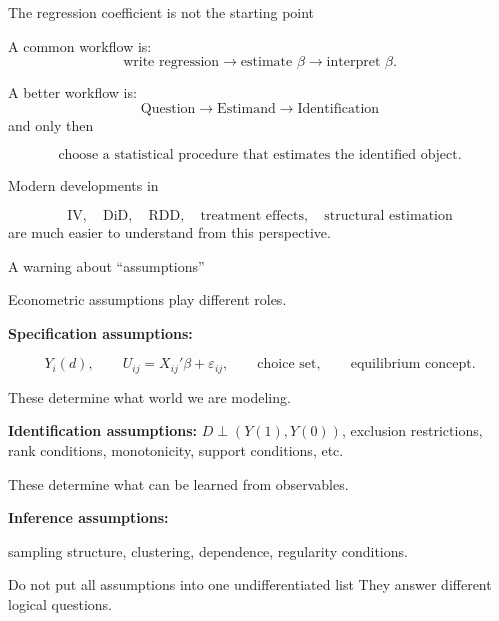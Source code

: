 \documentclass[aspectratio=169,11pt]{beamer}
\begin{document}
\begin{frame}{The regression coefficient is not the starting point}

A common workflow is:
\[
\text{write regression}
\rightarrow
\text{estimate }\beta
\rightarrow
\text{interpret }\beta.
\]

A better workflow is:
\[
\boxed{
\text{Question}
\rightarrow
\text{Estimand}
\rightarrow
\text{Identification}
}
\]
and only then

\[
\boxed{
\text{choose a statistical procedure that estimates the identified object}.
}
\]

\vspace{0.4em}

Modern developments in

\[
\text{IV},
\quad
\text{DiD},
\quad
\text{RDD},
\quad
\text{treatment effects},
\quad
\text{structural estimation}
\]
are much easier to understand from this perspective.

\end{frame}

\begin{frame}{A warning about ``assumptions''}

Econometric assumptions play different roles.

\vspace{0.3em}

\textbf{Specification assumptions:}

\[
Y_i(d),
\qquad
U_{ij}=X_{ij}'\beta+\varepsilon_{ij},
\qquad
\text{choice set},
\qquad
\text{equilibrium concept}.
\]

These determine what world we are modeling.

\vspace{0.3em}

\textbf{Identification assumptions:} $D\perp(Y(1),Y(0))$,
exclusion restrictions, rank conditions, monotonicity,
support conditions, etc.

These determine what can be learned from observables.

\vspace{0.3em}

\textbf{Inference assumptions:}

sampling structure, clustering, dependence,
regularity conditions.

\vspace{0.35em}

\begin{alertblock}{Do not put all assumptions into one undifferentiated list}
They answer different logical questions.
\end{alertblock}

\end{frame}
\end{document}
